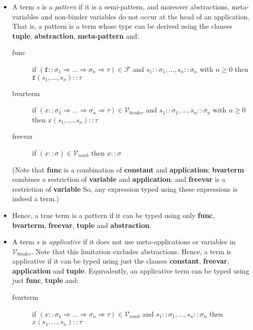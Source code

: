 \documentclass{lmcs}
\theoremstyle{theorem}\newtheorem{theorem}{Theorem}
\theoremstyle{theorem}\newtheorem{lemma}[theorem]{Lemma}
\theoremstyle{theorem}\newtheorem{corollary}[theorem]{Corollary}
\theoremstyle{definition}\newtheorem{definition}[theorem]{Definition}
\theoremstyle{definition}\newtheorem{example}[theorem]{Example}
\newcommand{\F}{\mathcal{F}}
\newcommand{\Vfree}{\mathcal{V}_{\mathit{nonb}}}
\newcommand{\Vbound}{\mathcal{V}_{\mathit{binder}}}
\newcommand{\atype}{\sigma}
\newcommand{\btype}{\tau}
\newcommand{\identifier}[1]{\mathtt{#1}}
\newcommand{\afun}{\identifier{f}}
\newcommand{\avar}{x}
\newcommand{\clause}[1]{\textbf{#1}}
\newcommand{\arrtype}{\Rightarrow}
\begin{document}
\begin{itemize}
\item A term $s$ is a \emph{pattern} if it is a semi-pattern, and moreover
  abstractions, meta-variables and non-binder variables do not occur at the head
  of an application.
  That is, a pattern is a term whose type can be derived using the clauses
  \clause{tuple}, \clause{abstraction}, \clause{meta-pattern} and:
  \begin{description}
  \item[func] if $(\afun :: \atype_1 \arrtype \dots \arrtype \atype_n
    \arrtype \btype) \in \F$ and $s_1 :: \atype_1,\dots,s_n :: \atype_n$ with
    $n \geq 0$ then $\afun(s_1,\dots,s_n) :: \btype$
  \item[bvarterm] if $(\avar :: \atype_1 \arrtype \dots \arrtype \atype_n
    \arrtype \btype) \in \Vbound$ and $s_1 :: \atype_1,\dots,s_n :: \atype_n$
    with $n \geq 0$ then $\avar(s_1,\dots,s_n) :: \btype$
  \item[freevar] if $(\avar :: \atype) \in \Vfree$ then $\avar :: \atype$
  \end{description}
  (Note that \clause{func} is a combination of \clause{constant} and
  \clause{application}; \clause{bvarterm} combines a restriction of
  \clause{variable} and \clause{application}; and \clause{freevar} is a
  restriction of \clause{variable}
  So, any expression typed using these expressions is indeed a term.)

\item Hence, a true term is a pattern if it can be typed using only
  \clause{func}, \clause{bvarterm}, \clause{freevar}, \clause{tuple} and
  \clause{abstraction}.

\item A term $s$ is \emph{applicative} if it does not use meta-applications or
  variables in $\Vbound$.  Note that this limitation excludes abstractions.
  Hence, a term is applicative if it can be typed using just the clauses
  \clause{constant}, \clause{freevar}, \clause{application} and \clause{tuple}.
  Equivalently, an applicative term can be typed using just \clause{func},
  \clause{tuple} and:
  \begin{description}
  \item[fvarterm] if $(\avar :: \atype_1 \arrtype \dots \arrtype \atype_n
    \arrtype \btype) \in \Vfree$ and $s_1 :: \atype_1,\dots,s_n :: \atype_n$
    then $\avar(s_1,\dots,s_n) :: \btype$
  \end{description}


\end{itemize}
\end{document}
